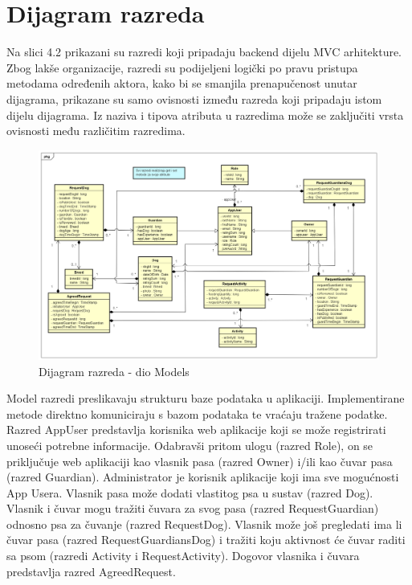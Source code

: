 			\eject
			
			
		\section{Dijagram razreda}
		
			Na slici 4.2 prikazani su razredi koji pripadaju backend dijelu MVC arhitekture.  Zbog lakše organizacije, razredi su podijeljeni logički po pravu pristupa metodama određenih aktora, kako bi se smanjila prenapučenost unutar dijagrama, prikazane su samo ovisnosti između razreda koji pripadaju istom dijelu dijagrama. Iz naziva i tipova atributa u razredima može se zaključiti vrsta ovisnosti među različitim razredima.
			
			\begin{figure}[htb]
				\centering
				\includegraphics[width=16cm]{slike/Class Diagram}
				\caption{Dijagram razreda - dio Models} 
				\label{fig:Class-Diagram}
			\end{figure}
		
			Model razredi preslikavaju strukturu baze podataka u aplikaciji. Implementirane metode direktno komuniciraju s bazom podataka te vraćaju tražene podatke.\\
			Razred AppUser predstavlja korisnika web aplikacije koji se može registrirati unoseći potrebne informacije. Odabravši pritom ulogu (razred Role), on se priključuje web aplikaciji kao vlasnik pasa (razred Owner) i/ili kao čuvar pasa (razred Guardian). Administrator je korisnik aplikacije koji ima sve mogućnosti App Usera. Vlasnik pasa može dodati vlastitog psa u sustav (razred Dog). Vlasnik i čuvar mogu tražiti čuvara za svog pasa (razred RequestGuardian) odnosno psa za čuvanje (razred RequestDog). Vlasnik može još pregledati ima li čuvar pasa (razred RequestGuardiansDog) i tražiti koju aktivnost će čuvar raditi sa psom (razredi Activity i RequestActivity). Dogovor vlasnika i čuvara predstavlja razred AgreedRequest.
			

